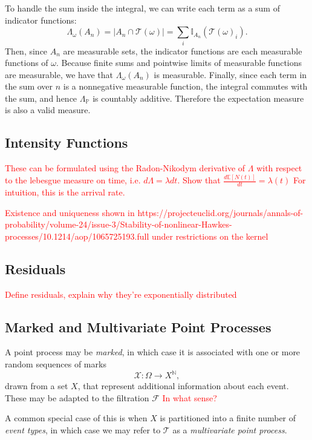\documentclass[honours,12pt]{unswthesis}
\numberwithin{equation}{section}
\begin{document}
To handle the sum inside the integral, we can write each term as a sum of indicator functions:
$$\Lambda_\omega(A_n) = \left\vert A_n\cap \mathcal{T}(\omega)\right\vert = \sum_i \mathbb{I}_{A_n}\left(\mathcal{T}(\omega)_i\right).$$
Then, since $A_n$ are measurable sets, the indicator functions are each measurable functions of $\omega$. Because finite sums and pointwise limits of measurable functions are measurable, we have that $\Lambda_\omega(A_n)$ is measurable.  Finally, since each term in the sum over $n$ is a nonnegative measurable function, the integral commutes with the sum, and hence $\Lambda_\mathbb{P}$ is countably additive. Therefore the expectation measure is also a valid measure.

\subsection{Intensity Functions}
\textcolor{red}{These can be formulated using the Radon-Nikodym derivative of $\Lambda$ with respect to the lebesgue measure on time, i.e. $d\Lambda=\lambda dt$.}
\textcolor{red}{Show that $\frac{d\mathbb{E}[N(t)]}{dt}=\lambda(t)$}
\textcolor{red}{For intuition, this is the arrival rate.}

\textcolor{red}{Existence and uniqueness shown in https://projecteuclid.org/journals/annals-of-probability/volume-24/issue-3/Stability-of-nonlinear-Hawkes-processes/10.1214/aop/1065725193.full under restrictions on the kernel}

\subsection{Residuals}
\textcolor{red}{Define residuals, explain why they're exponentially distributed}

\subsection{Marked and Multivariate Point Processes}

A point process  may be \textit{marked}, in which case it is associated with one or more random sequences of marks $$\mathcal{X}:\Omega\to X^\mathbb{N},$$
drawn from a set $X$, that represent additional information about each event. These may be adapted to the filtration $\mathcal{F}$ \textcolor{red}{In what sense?}

A common special case of this is when $X$ is partitioned into a finite number of \textit{event types}, in which case we may refer to $\mathcal{T}$ as a \textit{multivariate point process}.
\end{document}
